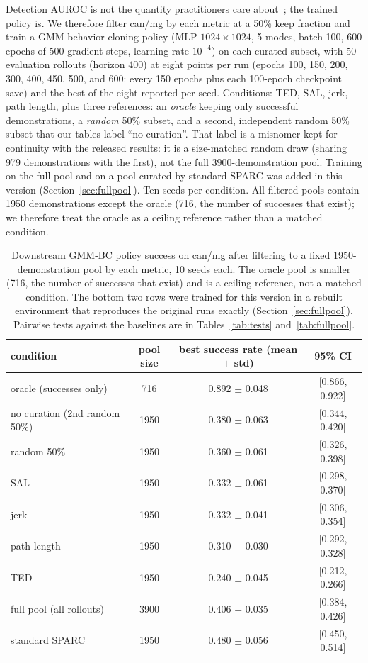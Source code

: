 \documentclass[10pt]{article}
\begin{document}
Detection AUROC is not the quantity practitioners care
about~\citep{bedi-policy}; the trained policy is. We therefore filter can/mg
by each metric at a 50\% keep fraction and train a GMM behavior-cloning
policy (MLP $1024{\times}1024$, 5 modes, batch 100, 600 epochs of 500
gradient steps, learning rate $10^{-4}$) on each curated subset, with 50
evaluation rollouts (horizon 400) at eight points per run (epochs 100, 150,
200, 300, 400, 450, 500, and 600: every 150 epochs plus each 100-epoch
checkpoint save) and the best of the eight reported per seed. Conditions: TED, SAL, jerk, path length, plus three
references: an \emph{oracle} keeping only successful demonstrations, a
\emph{random} 50\% subset, and a second, independent random 50\% subset that
our tables label ``no curation''. That label is a misnomer kept for
continuity with the released results: it is a size-matched random draw
(sharing 979 demonstrations with the first), not the full
3900-demonstration pool. Training on the full pool and on a pool curated by
standard SPARC was added in this version (Section~\ref{sec:fullpool}). Ten
seeds per condition. All filtered pools contain 1950 demonstrations except the
oracle (716, the number of successes that exist); we therefore treat the
oracle as a ceiling reference rather than a matched condition.

\begin{table}[t]
\centering
\small
\begin{tabular}{lccc}
\toprule
condition & pool size & best success rate (mean $\pm$ std) & 95\% CI \\
\midrule
oracle (successes only) & 716 & 0.892 $\pm$ 0.048 & [0.866, 0.922] \\
\midrule
no curation (2nd random 50\%) & 1950 & 0.380 $\pm$ 0.063 & [0.344, 0.420] \\
random 50\%             & 1950 & 0.360 $\pm$ 0.061 & [0.326, 0.398] \\
\midrule
SAL                     & 1950 & 0.332 $\pm$ 0.061 & [0.298, 0.370] \\
jerk                    & 1950 & 0.332 $\pm$ 0.041 & [0.306, 0.354] \\
path length             & 1950 & 0.310 $\pm$ 0.030 & [0.292, 0.328] \\
TED                     & 1950 & 0.240 $\pm$ 0.045 & [0.212, 0.266] \\
\midrule
full pool (all rollouts)  & 3900 & 0.406 $\pm$ 0.035 & [0.384, 0.426] \\
standard SPARC          & 1950 & 0.480 $\pm$ 0.056 & [0.450, 0.514] \\
\bottomrule
\end{tabular}
\caption{Downstream GMM-BC policy success on can/mg after filtering to a
fixed 1950-demonstration pool by each metric, 10 seeds each. The oracle pool
is smaller (716, the number of successes that exist) and is a ceiling
reference, not a matched condition. The bottom two rows were trained for
this version in a rebuilt environment that reproduces the original runs
exactly (Section~\ref{sec:fullpool}). Pairwise tests against the baselines
are in Tables~\ref{tab:tests} and~\ref{tab:fullpool}.}
\label{tab:training}
\end{table}
\end{document}
